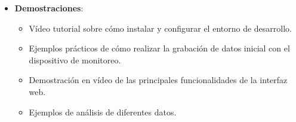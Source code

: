 \begin{itemize}
    \item \textbf{Demostraciones}:
    \begin{itemize}
        \item Vídeo tutorial sobre cómo instalar y configurar el entorno de desarrollo.
        \item Ejemplos prácticos de cómo realizar la grabación de datos inicial con el dispositivo de monitoreo.
        \item Demostración en vídeo de las principales funcionalidades de la interfaz web.
        \item Ejemplos de análisis de diferentes datos.
    \end{itemize}
    
\end{itemize}